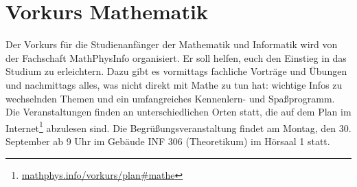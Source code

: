 \section{Vorkurs Mathematik}
Der Vorkurs für die Studienanfänger der Mathematik und Informatik wird von der Fachschaft MathPhysInfo organisiert. Er soll helfen, euch den Einstieg in das Studium zu erleichtern. Dazu gibt es vormittags fachliche Vorträge und Übungen und nachmittags alles, was nicht direkt mit Mathe zu tun hat: wichtige Infos zu wechselnden Themen und ein umfangreiches Kennenlern- und Spaßprogramm.
Die Veranstaltungen finden an unterschiedlichen Orten statt, die auf dem Plan im Internet\footnote{\url{mathphys.info/vorkurs/plan\#mathe}} abzulesen sind. Die Begrüßungsveranstaltung findet am Montag, den 30. September ab 9 Uhr im Gebäude \gls{INF} 306 (Theoretikum) im Hörsaal 1 statt.
